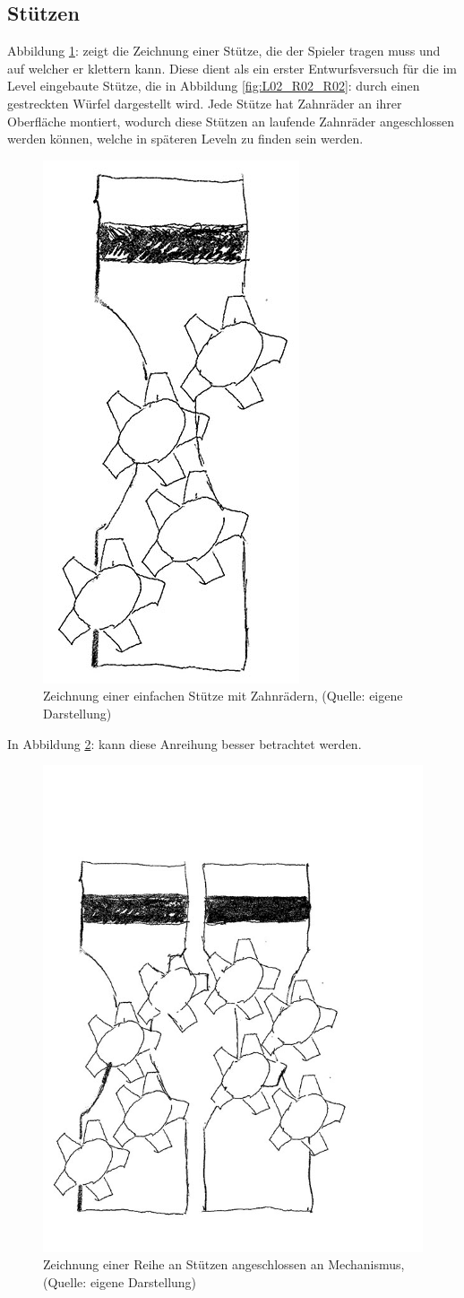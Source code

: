 \subsection{Stützen}
Abbildung \ref{fig:stuetze_01}:  zeigt die Zeichnung einer Stütze, die der Spieler tragen muss und auf welcher er klettern kann. Diese dient als ein erster Entwurfsversuch für die im Level eingebaute Stütze, die in Abbildung \ref{fig:L02_R02_R02}:  durch einen gestreckten Würfel dargestellt wird. Jede Stütze hat Zahnräder an ihrer Oberfläche montiert, wodurch diese Stützen an laufende Zahnräder angeschlossen werden können, welche in späteren Leveln zu finden sein werden.
\begin{figure}[ht]
\centering
\includegraphics[width=0.2\linewidth]{content/pictures/Stuetze_01.jpg}
\caption{Zeichnung einer einfachen Stütze mit Zahnrädern, (Quelle: eigene Darstellung)}
\label{fig:stuetze_01}
\end{figure}

In Abbildung \ref{fig:stuetze_02}:  kann diese Anreihung besser betrachtet werden.  

\begin{figure}[ht]
\centering
\includegraphics[width=0.4\linewidth]{content/pictures/Stuetze_02.jpg}
\caption{Zeichnung einer Reihe an Stützen angeschlossen an Mechanismus, (Quelle: eigene Darstellung)}
\label{fig:stuetze_02}
\end{figure}

